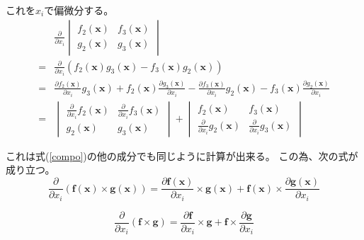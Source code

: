\documentclass[12pt,b5paper]{ltjsarticle}
\begin{document}
\begin{enumerate}
      これを$x_i$で偏微分する。
      \begin{align}
       & \frac{\partial}{\partial x_i}
       \begin{vmatrix}f_2(\bm{x})&f_3(\bm{x})\\ g_2(\bm{x})&g_3(\bm{x})\end{vmatrix}\\
       =& \frac{\partial}{\partial x_i}
       \left(f_2(\bm{x})g_3(\bm{x}) - f_3(\bm{x})g_2(\bm{x})\right)\\
       =& \frac{\partial f_2(\bm{x})}{\partial x_i}g_3(\bm{x})
       + f_2(\bm{x})\frac{\partial g_3(\bm{x})}{\partial x_i}
       - \frac{\partial f_3(\bm{x})}{\partial x_i}g_2(\bm{x})
       - f_3(\bm{x})\frac{\partial g_2(\bm{x})}{\partial x_i}\\
       =& \begin{vmatrix}
          \frac{\partial}{\partial x_i}f_2(\bm{x})&\frac{\partial}{\partial x_i}f_3(\bm{x})\\
           g_2(\bm{x})&g_3(\bm{x})
          \end{vmatrix}
       +  \begin{vmatrix}
          f_2(\bm{x})&f_3(\bm{x})\\
          \frac{\partial}{\partial x_i}g_2(\bm{x})&\frac{\partial}{\partial x_i}g_3(\bm{x})
          \end{vmatrix}
      \end{align}

      これは式(\ref{compo})の他の成分でも同じように計算が出来る。
      この為、次の式が成り立つ。
      \begin{equation}
       \frac{\partial}{\partial x_i}
        (\bm{f}(\bm{x})\times\bm{g}(\bm{x}))
        =
        \frac{\partial \bm{f}(\bm{x})}{\partial x_i}\times\bm{g}(\bm{x})
        +
        \bm{f}(\bm{x})\times\frac{\partial \bm{g}(\bm{x})}{\partial x_i}
      \end{equation}


      \begin{equation}
       \frac{\partial}{\partial x_i}(\bm{f}\times\bm{g})
        = \frac{\partial \bm{f}}{\partial x_i}\times\bm{g}
        + \bm{f}\times\frac{\partial \bm{g}}{\partial x_i}
      \end{equation}

\end{enumerate}

\hrulefill
\end{document}
